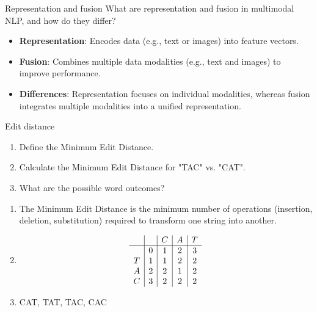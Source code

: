 \documentclass{article}
\begin{document}
\begin{exercise}{Representation and fusion}
  What are representation and fusion in multimodal NLP, and how do they differ?

  \begin{solution}
    \begin{itemize}
        \item \textbf{Representation}: Encodes data (e.g., text or images) into feature vectors.
        \item \textbf{Fusion}: Combines multiple data modalities (e.g., text and images) to improve performance.
        \item \textbf{Differences}: Representation focuses on individual modalities, whereas fusion integrates multiple modalities into a unified representation.
    \end{itemize}
  \end{solution}
\end{exercise}

\begin{exercise}{Edit distance}\label{ex:edit-distance}
  \begin{enumerate}
    \item Define the Minimum Edit Distance.
    \item Calculate the Minimum Edit Distance for "TAC" vs. "CAT".
    \item What are the possible word outcomes?
  \end{enumerate}

  \begin{solution}
    \begin{enumerate}
        \item The Minimum Edit Distance is the minimum number of operations (insertion, deletion, substitution) required to transform one string into another.
        \item \[\begin{array}{c|c|c|c|c}
            &  & C & A & T \\
            \hline
            & 0 & 1 & 2 & 3 \\
            T & 1 & 1 & 2 & 2 \\
            A & 2 & 2 & 1 & 2 \\
            C & 3 & 2 & 2 & 2 \\
        \end{array}\]
        \item CAT, TAT, TAC, CAC
    \end{enumerate}
  \end{solution}
\end{exercise}
\end{document}
